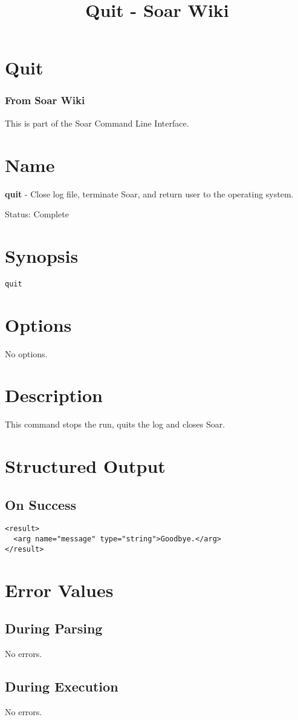 \documentclass[10pt]{article}
\title{Quit - Soar Wiki}
\begin{document}
\section*{Quit}
\subsubsection*{From Soar Wiki}


 This is part of the Soar Command Line Interface. 
\section*{ Name }


 \textbf{quit}
 - Close log file, terminate Soar, and return user to the operating system. 


 Status: Complete
\section*{ Synopsis }
\begin{verbatim}
quit

\end{verbatim}
\section*{ Options }


 No options. 
\section*{ Description }


 This command stops the run, quits the log and closes Soar. 
\section*{ Structured Output }
\subsection*{ On Success }
\begin{verbatim}
<result>
  <arg name="message" type="string">Goodbye.</arg>
</result>

\end{verbatim}
\section*{ Error Values }
\subsection*{ During Parsing }


 No errors. 
\subsection*{ During Execution }


 No errors. 
\end{document}
